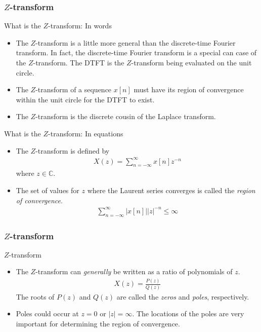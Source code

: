 \documentclass[mathserif,9pt,handout]{beamer}
\begin{document}
\begin{frame}\frametitle{$Z$-transform}\small
  \begin{block}{What is the $Z$-transform: In words}
    \begin{itemize}
      \item The $Z$-transform is a little more general than the discrete-time Fourier transform. In fact, the discrete-time Fourier transform is a special can case of the $Z$-transform. The DTFT is the $Z$-transform being evaluated on the unit circle. 
      \item The $Z$-transform of a sequence $x[n]$ must have its region of convergence within the unit circle for the DTFT to exist. 
      \item The $Z$-transform is the discrete cousin of the Laplace transform. 
    \end{itemize}
  \end{block}
  
  \begin{exampleblock}{What is the $Z$-transform: In equations}
    \begin{itemize}
      \item The $Z$-transform is defined by
        \begin{align}
          X(z) = \sum_{n=-\infty}^{\infty} x[n] z^{-n} 
          \nonumber
        \end{align}
        where $z \in \mathbb{C}$.
      \item The set of values for $z$ where the Laurent series converges is called the {\em\color{green!50!black}region of convergence}. 
        \begin{align}
          \sum_{n=-\infty}^{\infty} |x[n]| |z|^{-n} \leq \infty
          \nonumber
        \end{align}
    \end{itemize}
  \end{exampleblock}
\end{frame}


\begin{frame}\frametitle{$Z$-transform}\small
  \begin{block}{$Z$-transform}
    \begin{itemize}
      \item The $Z$-transform can {\em\color{blue!50!black}generally} be written as a ratio of polynomials of $z$.
        \begin{align}
          X(z) =\frac{P(z)}{Q(z)}
          \nonumber
        \end{align} 
        The roots of $P(z)$ and $Q(z)$ are called the {\em\color{blue!50!black}zeros} and {\em\color{blue!50!black}poles}, respectively. 
      \item Poles could occur at $z=0$ or $|z|=\infty$. The locations of the poles are very important for determining the region of convergence. 
    \end{itemize}
  \end{block}
\end{frame}
\end{document}
